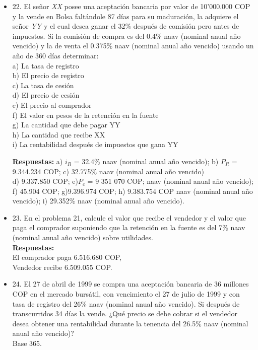 \begin{itemize}
 \item 22. El señor \textit{XX} posee una aceptación bancaria por valor de 10’000.000 COP y la vende en Bolsa faltándole 87 días para su maduración, la adquiere el señor \textit{YY} y el cual desea ganar el 32\% después de comisión pero antes de impuestos. Si la comisión de compra es del 0.4\% naav (nominal anual año vencido) y la de venta el 0.375\% naav (nominal anual año vencido) usando un año de 360 días determinar:\\
       a)   La tasa de registro\\
       b)   El precio de registro\\
       c)   La tasa de cesión\\
       d)   El precio de cesión\\
       e)   El precio al comprador\\
       f)   El valor en pesos de la retención en la fuente\\
       g)   La cantidad que debe pagar YY\\
       h)   La cantidad que recibe XX\\
       i)   La rentabilidad después de impuestos que gana YY
       
       \textbf{Respuestas:} a) $i_{R}$ = 32.4\% naav (nominal anual año vencido); b) $P_{R}$ = 9.344.234 COP; c) 32.775\% naav (nominal anual año vencido)  \\
       d) 9.337.850 COP; e)$P_{c}$ = 9 351 070 COP;  naav (nominal anual año vencido); f) 45.904 COP; g)9.396.974 COP;
       h) 9.383.754 COP naav (nominal anual año vencido); i) 29.352\% naav (nominal anual año vencido).\\
       \medskip

 \item 23. En el problema 21, calcule el valor que recibe el vendedor y el valor que paga el comprador suponiendo que la retención en la fuente es del 7\% naav (nominal anual año vencido) sobre utilidades.\\
       \textbf{Respuestas:}\\
       El comprador paga 6.516.680 COP,\\
       Vendedor recibe 6.509.055 COP.\\
       \medskip

 \item 24. El 27 de abril de 1999 se compra una aceptación bancaria de 36 millones COP en el mercado bursátil, con vencimiento el 27 de julio de 1999 y con tasa de registro del 26\% naav (nominal anual año vencido). Si después de transcurridos 34 días la vende. ¿Qué precio se debe cobrar si el vendedor desea obtener una rentabilidad durante la tenencia del 26.5\% naav (nominal anual año vencido)?\\
       Base 365.
       

\end{itemize}
